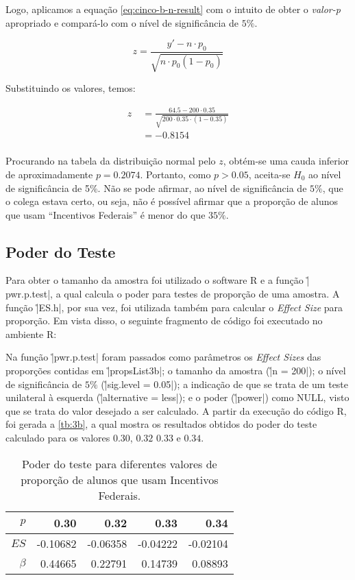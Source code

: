 Logo, aplicamos a equação \ref{eq:cinco-b-n-result} com o intuito de obter o \textit{valor-p} 
apropriado e compará-lo com o nível de significância de $5\%$.

\begin{equation}
  \label{eq:cinco-b-n-result}
  z = \frac{y' - n \cdot p_0}{ \sqrt{n \cdot p_0 (1 - p_0)} }
\end{equation}

Substituindo os valores, temos:

\begin{align*}
  z &\;= \frac{64.5 - 200 \cdot 0.35}{ \sqrt{200 \cdot 0.35 \cdot (1 - 0.35)} } \\
    &\;= - 0.8154 \nonumber \\
\end{align*}

Procurando na tabela da distribuição normal pelo $z$, 
obtém-se uma cauda inferior de aproximadamente $p = 0.2074$.
Portanto, como $p > 0.05$, aceita-se $H_0$ ao nível de significância de 5\%. 
Não se pode afirmar, ao nível de significância de $5\%$, que o colega estava certo, ou seja, 
não é possível afirmar que a proporção de  alunos que usam ``Incentivos Federais'' é menor do que $35\%$.


\subsection{Poder do Teste}
\label{questao:3b}

Para obter o tamanho da amostra foi utilizado o software R e a função \r|pwr.p.test|, a qual calcula o poder para testes de proporção de uma amostra.
A função \r|ES.h|, por sua vez, foi utilizada também para calcular o \textit{Effect Size} para proporção.
Em vista disso, o seguinte fragmento de código foi executado no ambiente R:


Na função \r|pwr.p.test| foram passados como parâmetros os \textit{Effect Sizes} das proporções contidas em \r|propsList3b|;
o tamanho da amostra (\r|n = 200|); 
o nível de significância de $5\%$ (\r|sig.level = 0.05|);
a indicação de que se trata de um teste unilateral à esquerda (\r|alternative = less|); 
e o poder (\r|power|) como NULL, visto que se trata do valor desejado a ser calculado.
A partir da execução do código R, foi gerada a \autoref{tb:3b}, a qual mostra os resultados obtidos do poder do teste calculado para os valores $0.30$, $0.32$ $0.33$ e $0.34$.

\begin{table}[ht]
\centering
\caption{Poder do teste para diferentes valores de proporção de alunos que usam Incentivos Federais.} 
\label{tb:3b}
\begin{tabular}{rrrrr}
  \toprule
 $p$ & 0.30 & 0.32 & 0.33 & 0.34 \\ 
  \midrule
$ES$ 	& -0.10682 & -0.06358 & -0.04222 & -0.02104 \\ 
$\beta$ & 0.44665   & 0.22791   & 0.14739   & 0.08893  \\ 
   \bottomrule
\end{tabular}
\end{table}

